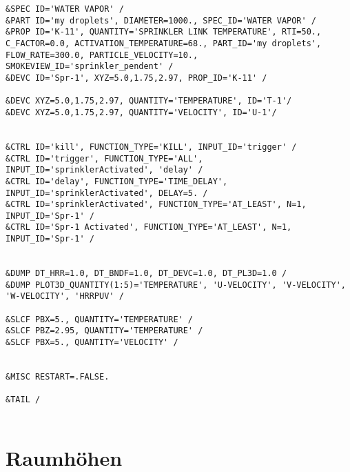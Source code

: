 \begin{lstlisting}[emptylines=0,basicstyle=\tiny]
&SPEC ID='WATER VAPOR' /
&PART ID='my droplets', DIAMETER=1000., SPEC_ID='WATER VAPOR' /
&PROP ID='K-11', QUANTITY='SPRINKLER LINK TEMPERATURE', RTI=50., C_FACTOR=0.0, ACTIVATION_TEMPERATURE=68., PART_ID='my droplets', FLOW_RATE=300.0, PARTICLE_VELOCITY=10., SMOKEVIEW_ID='sprinkler_pendent' /
&DEVC ID='Spr-1', XYZ=5.0,1.75,2.97, PROP_ID='K-11' /

&DEVC XYZ=5.0,1.75,2.97, QUANTITY='TEMPERATURE', ID='T-1'/
&DEVC XYZ=5.0,1.75,2.97, QUANTITY='VELOCITY', ID='U-1'/


&CTRL ID='kill', FUNCTION_TYPE='KILL', INPUT_ID='trigger' /
&CTRL ID='trigger', FUNCTION_TYPE='ALL', INPUT_ID='sprinklerActivated', 'delay' /
&CTRL ID='delay', FUNCTION_TYPE='TIME_DELAY', INPUT_ID='sprinklerActivated', DELAY=5. /
&CTRL ID='sprinklerActivated', FUNCTION_TYPE='AT_LEAST', N=1, INPUT_ID='Spr-1' /
&CTRL ID='Spr-1 Activated', FUNCTION_TYPE='AT_LEAST', N=1, INPUT_ID='Spr-1' /


&DUMP DT_HRR=1.0, DT_BNDF=1.0, DT_DEVC=1.0, DT_PL3D=1.0 /
&DUMP PLOT3D_QUANTITY(1:5)='TEMPERATURE', 'U-VELOCITY', 'V-VELOCITY', 'W-VELOCITY', 'HRRPUV' /

&SLCF PBX=5., QUANTITY='TEMPERATURE' /
&SLCF PBZ=2.95, QUANTITY='TEMPERATURE' /
&SLCF PBX=5., QUANTITY='VELOCITY' /


&MISC RESTART=.FALSE.

&TAIL /


\end{lstlisting}

\section{Raumhöhen}
